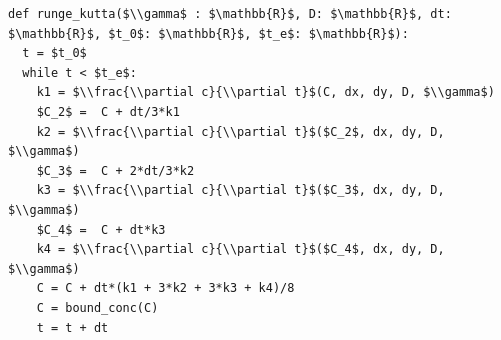 \documentclass[border=10pt]{standalone}
\begin{document}
\begin{lstlisting}
def runge_kutta($\\gamma$ : $\mathbb{R}$, D: $\mathbb{R}$, dt: $\mathbb{R}$, $t_0$: $\mathbb{R}$, $t_e$: $\mathbb{R}$):
  t = $t_0$
  while t < $t_e$:
    k1 = $\\frac{\\partial c}{\\partial t}$(C, dx, dy, D, $\\gamma$)  
    $C_2$ =  C + dt/3*k1
    k2 = $\\frac{\\partial c}{\\partial t}$($C_2$, dx, dy, D, $\\gamma$)
    $C_3$ =  C + 2*dt/3*k2
    k3 = $\\frac{\\partial c}{\\partial t}$($C_3$, dx, dy, D, $\\gamma$)
    $C_4$ =  C + dt*k3
    k4 = $\\frac{\\partial c}{\\partial t}$($C_4$, dx, dy, D, $\\gamma$)
    C = C + dt*(k1 + 3*k2 + 3*k3 + k4)/8
    C = bound_conc(C)
    t = t + dt
\end{lstlisting}
\end{document}
